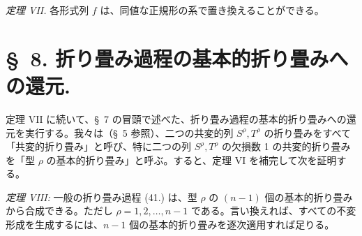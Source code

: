 \documentclass[11pt]{jlreq}
\begin{document}
\emph{定理 VII.} 各形式列 $f$ は、同値な正規形の系で置き換えることができる。

\section*{\S\ 8. 折り畳み過程の基本的折り畳みへの還元.}
定理 VII に続いて、\S\ 7 の冒頭で述べた、折り畳み過程の基本的折り畳みへの還元を実行する。我々は（\S\ 5 参照）、二つの共変的列 $S^\rho,T^\rho$ の折り畳みをすべて「共変的折り畳み」と呼び、特に二つの列 $S^\rho,T^\rho$ の欠損数 1 の共変的折り畳みを「型 $\rho$ の基本的折り畳み」と呼ぶ。すると、定理 VI を補完して次を証明する。

\emph{定理 VIII:} 一般の折り畳み過程 (41.) は、型 $\rho$ の $(n-1)$ 個の基本的折り畳みから合成できる。ただし $\rho=1,2,\ldots,n-1$ である。言い換えれば、すべての不変形成を生成するには、$n-1$ 個の基本的折り畳みを逐次適用すれば足りる。
\end{document}
